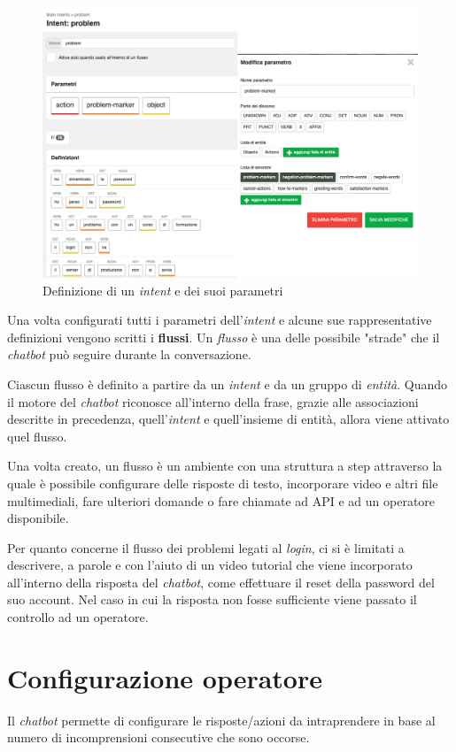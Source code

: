 \begin{figure}
    \centering{}
    \includegraphics*[width=\textwidth]{./img/problem-intent.png}
    \caption{Definizione di un \textit{intent} e dei suoi parametri}
    \label{fig:intent}
\end{figure}

Una volta configurati tutti i parametri dell'\textit{intent} e alcune sue rappresentative definizioni vengono scritti i \textbf{flussi}.
%
Un \textit{flusso} è una delle possibile "strade" che il \textit{chatbot} può seguire durante la conversazione.

Ciascun flusso è definito a partire da un \textit{intent} e da un gruppo di \textit{entità}. 
%
Quando il motore del \textit{chatbot} riconosce all'interno della frase, grazie alle associazioni descritte in precedenza, quell'\textit{intent} e quell'insieme di entità, allora viene attivato quel flusso.

Una volta creato, un flusso è un ambiente con una struttura a step attraverso la quale è possibile configurare delle risposte di testo, incorporare video e altri file multimediali, fare ulteriori domande o fare chiamate ad API e ad un operatore disponibile.

Per quanto concerne il flusso dei problemi legati al \textit{login}, ci si è limitati a descrivere, a parole e con l'aiuto di un video tutorial che viene incorporato all'interno della risposta del \textit{chatbot}, come effettuare il reset della password del suo account.
%
Nel caso in cui la risposta non fosse sufficiente viene passato il controllo ad un operatore.

\section{Configurazione operatore}
Il \textit{chatbot} permette di configurare le risposte/azioni da intraprendere in base al numero di incomprensioni consecutive che sono occorse. 

